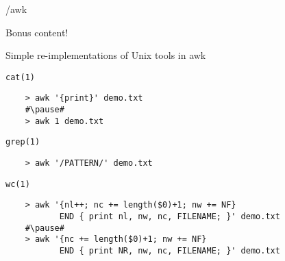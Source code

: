 \documentclass{beamer}
\renewcommand\big[1]{
  \begin{center}
    \Large{#1}
  \end{center}
}
\begin{document}
\begin{frame}
  \centering\Huge{/awk}
\end{frame}

\begin{frame}
  \centering\Huge{Bonus content!}
  \big{Simple re-implementations of Unix tools in awk}
\end{frame}

\begin{frame}[fragile]
  \big{\texttt{cat(1)}}
  \pause
  \begin{lstlisting}
    > awk '{print}' demo.txt
    #\pause#
    > awk 1 demo.txt
  \end{lstlisting}
\end{frame}

\begin{frame}[fragile]
  \big{\texttt{grep(1)}}
  \pause
  \begin{lstlisting}
    > awk '/PATTERN/' demo.txt
  \end{lstlisting}
\end{frame}

\begin{frame}[fragile]
  \big{\texttt{wc(1)}}
  \pause
  \begin{lstlisting}
    > awk '{nl++; nc += length($0)+1; nw += NF}
           END { print nl, nw, nc, FILENAME; }' demo.txt
    #\pause#
    > awk '{nc += length($0)+1; nw += NF}
           END { print NR, nw, nc, FILENAME; }' demo.txt
  \end{lstlisting}
\end{frame}
\end{document}
